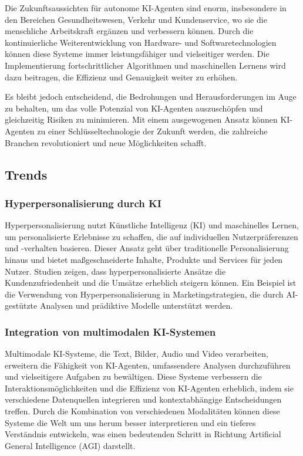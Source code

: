 \documentclass[conference]{IEEEtran}
\begin{document}
Die Zukunftsaussichten für autonome KI-Agenten sind enorm, insbesondere in den Bereichen Gesundheitswesen, Verkehr und Kundenservice, wo sie die menschliche Arbeitskraft ergänzen und verbessern können. Durch die kontinuierliche Weiterentwicklung von Hardware- und Softwaretechnologien können diese Systeme immer leistungsfähiger und vielseitiger werden. Die Implementierung fortschrittlicher Algorithmen und maschinellen Lernens wird dazu beitragen, die Effizienz und Genauigkeit weiter zu erhöhen.

Es bleibt jedoch entscheidend, die Bedrohungen und Herausforderungen im Auge zu behalten, um das volle Potenzial von KI-Agenten auszuschöpfen und gleichzeitig Risiken zu minimieren. Mit einem ausgewogenen Ansatz können KI-Agenten zu einer Schlüsseltechnologie der Zukunft werden, die zahlreiche Branchen revolutioniert und neue Möglichkeiten schafft.



\subsection{Trends}

\subsubsection{Hyperpersonalisierung durch KI}

Hyperpersonalisierung nutzt Künstliche Intelligenz (KI) und maschinelles Lernen, um personalisierte Erlebnisse zu schaffen, die auf individuellen Nutzerpräferenzen und -verhalten basieren. Dieser Ansatz geht über traditionelle Personalisierung hinaus und bietet maßgeschneiderte Inhalte, Produkte und Services für jeden Nutzer. Studien zeigen, dass hyperpersonalisierte Ansätze die Kundenzufriedenheit und die Umsätze erheblich steigern können. Ein Beispiel ist die Verwendung von Hyperpersonalisierung in Marketingstrategien, die durch AI-gestützte Analysen und prädiktive Modelle unterstützt werden\cite{gao_artificial_2022}\cite{noauthor_hyper-personalization_nodate}.

\subsubsection{Integration von multimodalen KI-Systemen}

Multimodale KI-Systeme, die Text, Bilder, Audio und Video verarbeiten, erweitern die Fähigkeit von KI-Agenten, umfassendere Analysen durchzuführen und vielseitigere Aufgaben zu bewältigen. Diese Systeme verbessern die Interaktionsmöglichkeiten und die Effizienz von KI-Agenten erheblich, indem sie verschiedene Datenquellen integrieren und kontextabhängige Entscheidungen treffen. Durch die Kombination von verschiedenen Modalitäten können diese Systeme die Welt um uns herum besser interpretieren und ein tieferes Verständnis entwickeln, was einen bedeutenden Schritt in Richtung Artificial General Intelligence (AGI) darstellt\cite{fei_towards_2022}.
\end{document}
